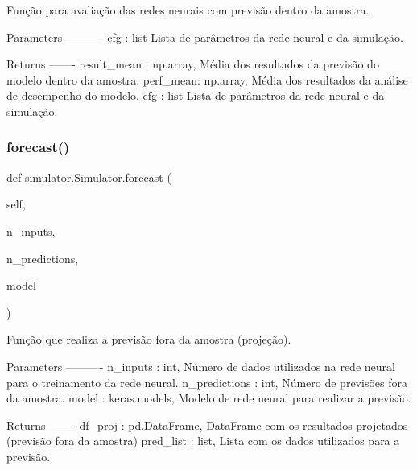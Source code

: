 \begin{DoxyVerb}Função para avaliação das redes neurais com previsão dentro da amostra.

Parameters
----------
cfg : list
    Lista de parâmetros da rede neural e da simulação.

Returns
-------
result_mean : np.array,
    Média dos resultados da previsão do modelo dentro da amostra.
perf_mean: np.array,
    Média dos resultados da análise de desempenho do modelo.  
cfg : list
    Lista de parâmetros da rede neural e da simulação.\end{DoxyVerb}
 \mbox{\label{classsimulator_1_1Simulator_ae83357e0a55faafa36c89566cd4cc07f}} 
\subsubsection{\texorpdfstring{forecast()}{forecast()}}
{\footnotesize\ttfamily def simulator.\+Simulator.\+forecast (\begin{DoxyParamCaption}\item[{}]{self,  }\item[{}]{n\+\_\+inputs,  }\item[{}]{n\+\_\+predictions,  }\item[{}]{model }\end{DoxyParamCaption})}

\begin{DoxyVerb}Função que realiza a previsão fora da amostra (projeção).

Parameters
----------
n_inputs : int,
    Número de dados utilizados na rede neural para o treinamento da 
    rede neural.
n_predictions : int,
    Número de previsões fora da amostra.
model : keras.models,
    Modelo de rede neural para realizar a previsão.

Returns
-------
df_proj : pd.DataFrame,
    DataFrame com os resultados projetados (previsão fora da amostra)
pred_list : list,
    Lista com os dados utilizados para a previsão.\end{DoxyVerb}
 \mbox{\label{classsimulator_1_1Simulator_a078e62ee729b120598da1c1c057a0884}} 
